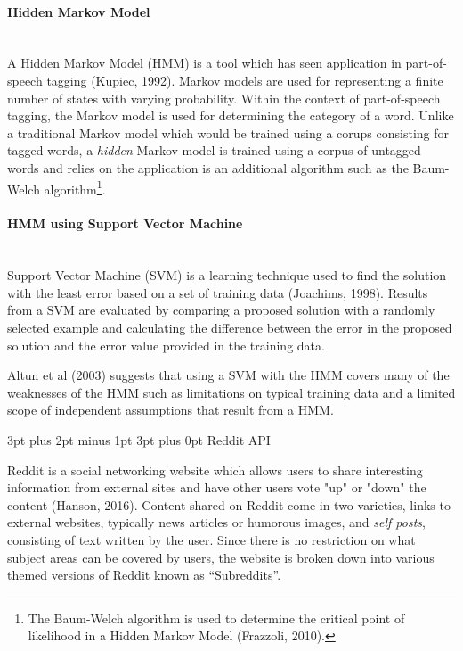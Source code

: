 \documentclass[12pt,a4paper]{article}
\makeatletter
\renewcommand\subsection{\@startsection {subsection}{1}{2mm} %
                               {3pt plus 2pt minus 1pt} %
                               {3pt plus 0pt} %
                               {\normalfont\bfseries}}
\makeatother
\begin{document}
\paragraph{Hidden Markov Model}\mbox{}\\

A Hidden Markov Model (HMM) is a tool which has seen application in part-of-speech tagging (Kupiec, 1992). Markov models are used for representing a finite number of states with varying probability. Within the context of part-of-speech tagging, the Markov model is used for determining the category of a word. Unlike a traditional Markov model which would be trained using a corups consisting for tagged words, a \emph{hidden} Markov model is trained using a corpus of untagged words and relies on the application is an additional algorithm such as the Baum-Welch algorithm\footnote{The Baum-Welch algorithm is used to determine the critical point of likelihood in a Hidden Markov Model (Frazzoli, 2010).}.

\paragraph{HMM using Support Vector Machine}\mbox{}\\

Support Vector Machine (SVM) is a learning technique used to find the solution with the least error based on a set of training data (Joachims, 1998). Results from a SVM are evaluated by comparing a proposed solution with a randomly selected example and calculating the difference between the error in the proposed solution and the error value provided in the training data.

Altun et al (2003) suggests that using a SVM with the HMM covers many of the weaknesses of the HMM such as limitations on typical training data and a limited scope of independent assumptions that result from a HMM.

\subsection{Reddit API}

Reddit is a social networking website which allows users to share interesting information from external sites and have other users vote "up" or "down" the content (Hanson, 2016). Content shared on Reddit come in two varieties, links to external websites, typically news articles or humorous images, and \emph{self posts}, consisting of text written by the user. Since there is no restriction on what subject areas can be covered by users, the website is broken down into various themed versions of Reddit known as ``Subreddits''.
\end{document}

